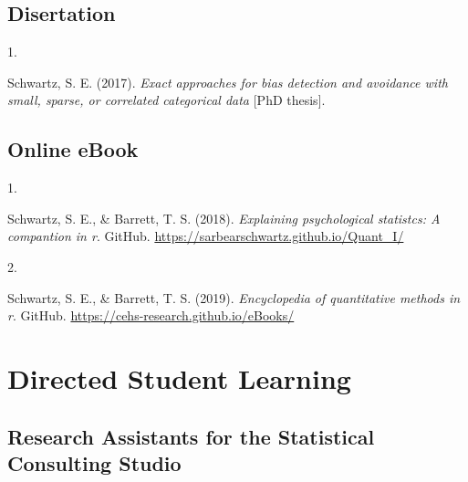 \documentclass[11pt,a4paper,]{moderncv}
\newlength{\csllabelwidth}
\newcommand{\CSLLeftMargin}[1]{\parbox[t]{\csllabelwidth}{#1}}
\newcommand{\CSLRightInline}[1]{\parbox[t]{\linewidth - \csllabelwidth}{#1}}
\begin{document}
\vspace{7mm}

\hypertarget{disertation}{%
\subsection{\texorpdfstring{\textbf{Disertation}}{Disertation}}\label{disertation}}

\hypertarget{refs_student}{}
\leavevmode{}%
\CSLLeftMargin{1. }
\CSLRightInline{Schwartz, S. E. (2017). \emph{Exact approaches for bias
detection and avoidance with small, sparse, or correlated categorical
data} {[}PhD thesis{]}.}

\vspace{7mm}

\hypertarget{online-ebook}{%
\subsection{\texorpdfstring{\textbf{Online
eBook}}{Online eBook}}\label{online-ebook}}

\hypertarget{refs_ebook}{}
\leavevmode{}%
\CSLLeftMargin{1. }
\CSLRightInline{Schwartz, S. E., \& Barrett, T. S. (2018).
\emph{Explaining psychological statistcs: A compantion in r}. GitHub.
\url{https://sarbearschwartz.github.io/Quant_I/}}

\leavevmode{}%
\CSLLeftMargin{2. }
\CSLRightInline{Schwartz, S. E., \& Barrett, T. S. (2019).
\emph{Encyclopedia of quantitative methods in r}. GitHub.
\url{https://cehs-research.github.io/eBooks/}}

\clearpage

\hypertarget{directed-student-learning}{%
\section{Directed Student Learning}\label{directed-student-learning}}

\hypertarget{research-assistants-for-the-statistical-consulting-studio}{%
\subsection{\texorpdfstring{\textbf{Research Assistants for the
Statistical Consulting
Studio}}{Research Assistants for the Statistical Consulting Studio}}\label{research-assistants-for-the-statistical-consulting-studio}}
\end{document}
